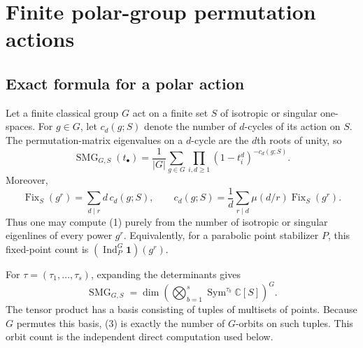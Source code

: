 \documentclass[10pt]{article}
\newcommand{\Sym}{\operatorname{Sym}}
\newcommand{\Fix}{\operatorname{Fix}}
\newcommand{\SMG}{\operatorname{SMG}}
\newcommand{\F}{\mathbb F}
\begin{document}
\clearpage
\section{Finite polar-group permutation actions}\label{proof:finite-polar}
\begingroup
{}
\providecommand{\Sym}{\operatorname{Sym}}
\renewcommand{\Sym}{\operatorname{Sym}}
\providecommand{\Fix}{\operatorname{Fix}}
\renewcommand{\Fix}{\operatorname{Fix}}
\providecommand{\F}{\mathbb F}
\renewcommand{\F}{\mathbb F}
\providecommand{\Sg}{\SMG}
\renewcommand{\Sg}{\SMG}
\setcounter{theorem}{0}
\setcounter{proposition}{0}
\setcounter{lemma}{0}
\setcounter{corollary}{0}
\setcounter{remark}{0}
\begin{abstract}
This note specializes the exact permutation $\sigma$-MGF to isotropic and
singular point actions of finite unitary, symplectic, and orthogonal groups.
Witt extension proves the stable three-orbit classification of pairs.  The
companion marimo notebook constructs $Sp_4(2)$, $O_4^+(2)$, and $U_4(2)$ as
finite-field matrix groups, induces their point actions, and independently
compares direct orbit counts, cycle products, fixed-point reconstruction, and
matrix determinants.  Every tested coefficient agrees exactly.
\end{abstract}

\subsection{Exact formula for a polar action}
Let a finite classical group $G$ act on a finite set $S$ of isotropic or
singular one-spaces.  For $g\in G$, let $c_d(g;S)$ denote the number of
$d$-cycles of its action on $S$.  The permutation-matrix eigenvalues on a
$d$-cycle are the $d$th roots of unity, so
\begin{equation}
 \boxed{\Sg_{G,S}(t_\bullet)=\frac1{|G|}\sum_{g\in G}
 \prod_{i,d\geq1}(1-t_i^d)^{-c_d(g;S)}.}
\end{equation}
Moreover,
\begin{equation}
 \Fix_S(g^r)=\sum_{d\mid r}d\,c_d(g;S),\qquad
 c_d(g;S)=\frac1d\sum_{r\mid d}\mu(d/r)\Fix_S(g^r).
\end{equation}
Thus one may compute (1) purely from the number of isotropic or singular
eigenlines of every power $g^r$.  Equivalently, for a parabolic point
stabilizer $P$, this fixed-point count is
$(\operatorname{Ind}_P^G\mathbf1)(g^r)$.

For $\tau=(\tau_1,\ldots,\tau_s)$, expanding the determinants gives
\begin{equation}
 [m_\tau]\Sg_{G,S}=\dim\left(
 \bigotimes_{b=1}^s\Sym^{\tau_b}\mathbb C[S]\right)^G.
\end{equation}
The tensor product has a basis consisting of tuples of multisets of points.
Because $G$ permutes this basis, (3) is exactly the number of $G$-orbits on
such tuples.  This orbit count is the independent direct computation used
below.
\end{document}
